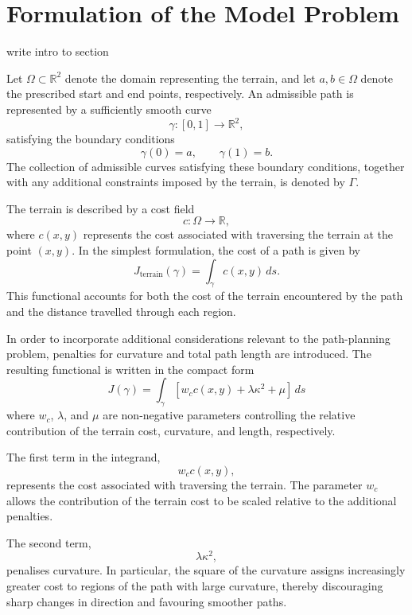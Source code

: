 \section{Formulation of the Model Problem}
\label{sec:model_problem}

{\color{red} write intro to section}

Let $\Omega \subset \mathbb{R}^2$ denote the domain representing the
terrain, and let $a,b \in \Omega$ denote the prescribed start and end
points, respectively. An admissible path is represented by a
sufficiently smooth curve
\[
\gamma : [0,1] \rightarrow \mathbb{R}^2,
\]
satisfying the boundary conditions
\[
\gamma(0)=a,
\qquad
\gamma(1)=b.
\]
The collection of admissible curves satisfying these boundary
conditions, together with any additional constraints imposed by the
terrain, is denoted by $\Gamma$.

The terrain is described by a cost field
\[
c:\Omega\rightarrow\mathbb{R},
\]
where $c(x,y)$ represents the cost associated with traversing the
terrain at the point $(x,y)$. In the simplest formulation, the cost of
a path is given by
\begin{equation}
J_{\mathrm{terrain}}(\gamma)
=
\int_\gamma c(x,y)\,ds.
\label{eq:terrain_functional}
\end{equation}
This functional accounts for both the cost of the terrain encountered
by the path and the distance travelled through each region.

In order to incorporate additional considerations relevant to the
path-planning problem, penalties for curvature and total path length
are introduced. The resulting functional is written in the compact
form
\begin{equation}
\boxed{
J(\gamma)
=
\int_\gamma
\left[
w_c c(x,y)
+
\lambda\kappa^2
+
\mu
\right]\,ds
}
\label{eq:ModelProblem}
\end{equation}
where $w_c$, $\lambda$, and $\mu$ are non-negative parameters controlling
the relative contribution of the terrain cost, curvature, and length,
respectively.

The first term in the integrand,
\[
w_c c(x,y),
\]
represents the cost associated with traversing the terrain. The
parameter $w_c$ allows the contribution of the terrain cost to be
scaled relative to the additional penalties.

The second term,
\[
\lambda\kappa^2,
\]
penalises curvature. In particular, the square of the curvature assigns
increasingly greater cost to regions of the path with large curvature,
thereby discouraging sharp changes in direction and favouring smoother
paths.

